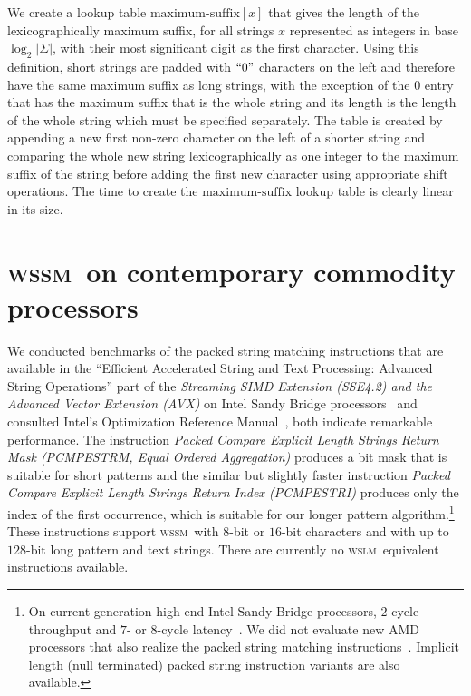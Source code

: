 \documentclass[12pt]{article}
\newcommand{\wssm}{\textsc{wssm}}
\newcommand{\wslm}{\textsc{wslm}}
\begin{document}
We create a lookup table $\mbox{maximum-suffix}[x]$ that
gives the length of the lexicographically maximum suffix,
for all strings $x$ represented as integers in base $\log_2 |\Sigma|$,
with their most significant digit as the first character.
Using this definition, short strings are padded with $``0"$
characters on the left and therefore have the same maximum
suffix as long strings, with the exception of the $0$ entry
that has the maximum suffix that is the whole string and its
length is the length of the whole string which must be
specified separately.
The table is created by appending a new first non-zero
character on the left of a shorter string and comparing the whole new string
lexicographically as one integer to the maximum suffix
of the string before adding the first new character using 
appropriate shift operations.
The time to create the $\mbox{maximum-suffix}$ 
lookup table is clearly linear in its size.







\section{\wssm\ on contemporary commodity processors}
\label{sec:hardware}
We conducted benchmarks of the 
packed string matching instructions 
that are available 
in the ``Efficient Accelerated String and Text Processing: Advanced String Operations'' 
part of the 
{\em Streaming SIMD Extension (SSE4.2) and the Advanced Vector Extension (AVX)}
 on Intel Sandy Bridge processors~\cite{intel-sse4:07,intel-avx:11} and consulted Intel's
Optimization Reference Manual~\cite{intel-optimization:11}, both
 indicate remarkable performance.
The instruction
{\em Packed Compare Explicit Length Strings Return Mask 
(PCMPESTRM, Equal Ordered Aggregation)}
produces a bit mask that is suitable for short patterns 
and the similar but slightly faster instruction
{\em Packed Compare Explicit Length Strings Return Index (PCMPESTRI)}
produces only the index of the first occurrence, 
which is suitable for our longer pattern algorithm.\footnote{On current generation high end Intel
  Sandy Bridge processors, $2$-cycle throughput and $7$- or $8$-cycle
  latency~\cite[\S C.3.1]{intel-optimization:11}. 
  We did not evaluate new AMD processors
  that also realize the packed string matching instructions~\cite{amd-avx:11,amd-optimization:11}.
  Implicit length (null terminated) packed string instruction  variants are also available.} 
These instructions support \wssm\ with $8$-bit or $16$-bit characters and
with up to $128$-bit long pattern and text strings.
There are currently no \wslm\ equivalent instructions available.
\end{document}
